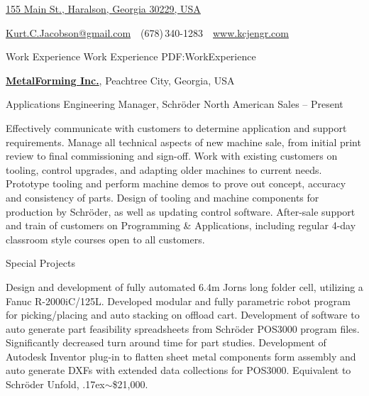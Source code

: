\documentclass[
letterpaper,
MMMyyyy,
nonstopmode,
]{resume}
\makeatletter
\newcommand{\CVAuthor}{Kurt C. Jacobson}
\newcommand{\CVWebpage}{www.kcjengr.com}
\newcommand{\CVEmail}{Kurt.C.Jacobson@gmail.com}
\makeatother
\begin{document}

\Title{\CVAuthor}

\begin{SubTitle}
\href{https://www.google.com/maps/place/155+Main+St,+Haralson,+GA+30229/}
{155 Main St., Haralson, Georgia 30229, USA}
\par
\href{mailto:\CVEmail}
{\CVEmail}
\,\SubBulletSymbol\,
(678)\,340-1283
\,\SubBulletSymbol\,
\href{\CVWebpage}
{\url{\CVWebpage}}
\end{SubTitle}

\begin{Body}



\Section
{Work Experience}
{Work Experience}
{PDF:WorkExperience}


\Entry
\href{https://www.metalforming-usa.com/}
{\textbf{MetalForming Inc.}},
Peachtree City, Georgia, USA

\Gap
\BulletItem
Applications Engineering Manager,
Schr{\"o}der North American Sales
\hfill
{} --
Present
\begin{Detail}
\SubBulletItem
Effectively communicate with customers to determine application and support requirements. 
\SubBulletItem
Manage all technical aspects of new machine sale, from initial print review to final commissioning and sign-off.
\SubBulletItem
Work with existing customers on tooling, control upgrades, and adapting older machines to current needs.  
\SubBulletItem
Prototype tooling and perform machine demos to prove out concept, accuracy and consistency of parts.
\SubBulletItem
Design of tooling and machine components for production by Schr{\"o}der, as well as updating control software.
\SubBulletItem
After-sale support and train of customers on Programming {\&} Applications, including regular 4-day classroom style courses open to all customers.
\end{Detail}

\Gap
\BulletItem
Special Projects
\hfill
\begin{Detail}
\SubBulletItem
Design and development of fully automated 6.4m Jorns long folder cell, utilizing a Fanuc R-2000iC/125L.
Developed modular and fully parametric robot program for picking/placing and auto stacking on offload cart.
\SubBulletItem
Development of software to auto generate part feasibility spreadsheets from Schr{\"o}der POS3000 program files.
Significantly decreased turn around time for part studies.
\SubBulletItem
Development of Autodesk Inventor plug-in to flatten sheet metal components form assembly and auto generate DXFs with extended data collections for POS3000. Equivalent to  Schr{\"o}der Unfold, {\raise.17ex\hbox{$\scriptstyle\mathtt{\sim}$}}{\$}21,000.
\end{Detail}


\end{Body}
\end{document}
